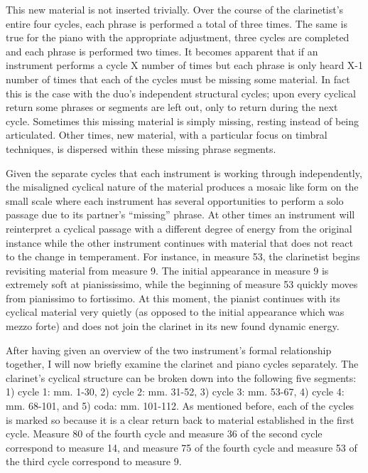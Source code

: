 This new material is not inserted trivially. Over the course of the clarinetist's entire four cycles, each phrase is performed a total of three times. The same is true for the piano with the appropriate adjustment, three cycles are completed and each phrase is performed two times. It becomes apparent that if an instrument performs a cycle X number of times but each phrase is only heard X-1 number of times that each of the cycles must be missing some material. In fact this is the case with the duo's independent structural cycles; upon every cyclical return some phrases or segments are left out, only to return during the next cycle. Sometimes this missing material is simply missing, resting instead of being articulated. Other times, new material, with a particular focus on timbral techniques, is dispersed within these missing phrase segments.

Given the separate cycles that each instrument is working through independently, the misaligned cyclical nature of the material produces a mosaic like form on the small scale where each instrument has several opportunities to perform a solo passage due to its partner's ``missing'' phrase. At other times an instrument will reinterpret a cyclical passage with a different degree of energy from the original instance while the other instrument continues with material that does not react to the change in temperament. For instance, in measure 53, the clarinetist begins revisiting material from measure 9. The initial appearance in measure 9 is extremely soft at pianississimo, while the beginning of measure 53 quickly moves from pianissimo to fortissimo. At this moment, the pianist continues with its cyclical material very quietly (as opposed to the initial appearance which was mezzo forte) and does not join the clarinet in its new found dynamic energy.

After having given an overview of the two instrument's formal relationship together, I will now briefly examine the clarinet and piano cycles separately. The clarinet's cyclical structure can be broken down into the following five segments: 1) cycle 1: mm. 1-30, 2) cycle 2: mm. 31-52, 3) cycle 3: mm. 53-67, 4) cycle 4: mm. 68-101, and 5) coda: mm. 101-112. As mentioned before, each of the cycles is marked so because it is a clear return back to material established in the first cycle. Measure 80 of the fourth cycle and measure 36 of the second cycle correspond to measure 14, and measure 75 of the fourth cycle and measure 53 of the third cycle correspond to measure 9.

